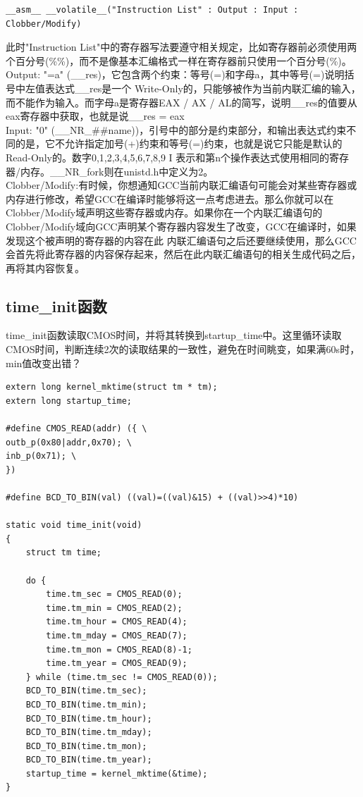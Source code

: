 \documentclass[12pt]{article}
\begin{document}
\begin{lstlisting}[breaklines]
__asm__ __volatile__("Instruction List" : Output : Input : Clobber/Modify)
\end{lstlisting}
此时"Instruction List"中的寄存器写法要遵守相关规定，比如寄存器前必须使用两个百分号(\%\%)，而不是像基本汇编格式一样在寄存器前只使用一个百分号(\%)。\\
Output: "=a" (\_\_res)，它包含两个约束：等号(=)和字母a，其中等号(=)说明括号中左值表达式\_\_res是一个 Write-Only的，只能够被作为当前内联汇编的输入，而不能作为输入。而字母a是寄存器EAX / AX / AL的简写，说明\_\_res的值要从eax寄存器中获取，也就是说\_\_res = eax \\
Input: "0" (\_\_NR\_\#\#name))，引号中的部分是约束部分，和输出表达式约束不同的是，它不允许指定加号(+)约束和等号(=)约束，也就是说它只能是默认的Read-Only的。数字0,1,2,3,4,5,6,7,8,9 I 表示和第n个操作表达式使用相同的寄存器/内存。\_\_NR\_fork则在unistd.h中定义为2。\\
Clobber/Modify:有时候，你想通知GCC当前内联汇编语句可能会对某些寄存器或内存进行修改，希望GCC在编译时能够将这一点考虑进去。那么你就可以在Clobber/Modify域声明这些寄存器或内存。如果你在一个内联汇编语句的Clobber/Modify域向GCC声明某个寄存器内容发生了改变，GCC在编译时，如果发现这个被声明的寄存器的内容在此 内联汇编语句之后还要继续使用，那么GCC会首先将此寄存器的内容保存起来，然后在此内联汇编语句的相关生成代码之后，再将其内容恢复。
\subsection{time\_init函数}	
time\_init函数读取CMOS时间，并将其转换到startup\_time中。这里循环读取CMOS时间，判断连续2次的读取结果的一致性，避免在时间眺变，如果满60s时，min值改变出错？
\begin{lstlisting}[breaklines]
extern long kernel_mktime(struct tm * tm);
extern long startup_time;

#define CMOS_READ(addr) ({ \
outb_p(0x80|addr,0x70); \
inb_p(0x71); \
})

#define BCD_TO_BIN(val) ((val)=((val)&15) + ((val)>>4)*10)

static void time_init(void)
{
	struct tm time;

	do {
		time.tm_sec = CMOS_READ(0);
		time.tm_min = CMOS_READ(2);
		time.tm_hour = CMOS_READ(4);
		time.tm_mday = CMOS_READ(7);
		time.tm_mon = CMOS_READ(8)-1;
		time.tm_year = CMOS_READ(9);
	} while (time.tm_sec != CMOS_READ(0));
	BCD_TO_BIN(time.tm_sec);
	BCD_TO_BIN(time.tm_min);
	BCD_TO_BIN(time.tm_hour);
	BCD_TO_BIN(time.tm_mday);
	BCD_TO_BIN(time.tm_mon);
	BCD_TO_BIN(time.tm_year);
	startup_time = kernel_mktime(&time);
}
\end{lstlisting}
\end{document}
